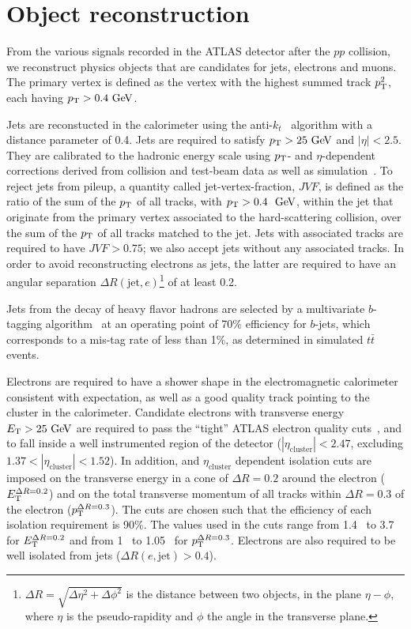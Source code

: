 \section{Object reconstruction}\label{sect:objects}
From the various signals recorded in the ATLAS detector after the $pp$ collision, we reconstruct
physics objects that are candidates for jets, electrons and muons. The primary vertex is defined
as the vertex with the highest summed track $p_{\mathrm{T}}^2$, each having $\pT>0.4 \GeV{}$.

Jets are reconstucted in the calorimeter using the anti-$k_t$~\cite{Cacciari:2008gp} algorithm with
a distance parameter of 0.4. Jets are required to satisfy $\pt>25 \GeV$ and $|\eta|<2.5$. They are
calibrated to the hadronic energy scale using $p_{\mathrm{T}}$- and $\eta$-dependent corrections derived from
collision and test-beam data as well as simulation~\cite{Aad:2011he}. To reject jets from pileup, 
a quantity called jet-vertex-fraction, $JVF$, is defined as the ratio of the sum
of the $p_{\mathrm{T}}$ of all tracks, with $\pt>0.4~\GeV{}$, within the jet that originate from the primary 
vertex associated to the hard-scattering collision, over the sum of the $p_{\mathrm{T}}$ of all tracks 
matched to the jet. Jets with associated tracks are required to have $JVF>0.75$; we also
accept jets without any associated tracks. In order to avoid reconstructing electrons as jets,
the latter are required to have an angular separation 
$\Delta R(\mathrm{jet},e)$\footnote{$\Delta R=\sqrt{\Delta\eta^2+\Delta\phi^2}$ is the distance 
between two objects, in
the plane $\eta-\phi$, where $\eta$ is the pseudo-rapidity and $\phi$ the angle in the transverse
plane.} of at least 0.2.

Jets from the decay of heavy flavor hadrons are selected by a multivariate $b$-tagging 
algorithm~\cite{ATLAS-CONF-2012-043} at an operating point of 70\% efficiency for $b$-jets, which
corresponds to a
mis-tag rate of less than 1\%, as determined in simulated $t\bar{t}$ events.

Electrons are required to have a shower shape in the electromagnetic calorimeter consistent with
expectation, as well as a good quality track pointing to the cluster in the calorimeter.
Candidate electrons with transverse energy $\ET>25 \GeV$ are required to pass the ``tight''
ATLAS electron quality cuts~\cite{Aad:2011mk}, and to fall inside a well instrumented region
of the detector ($|\eta_\mathrm{cluster}|<2.47$, excluding $1.37<|\eta_\mathrm{cluster}|<1.52$). 
In addition, \ET{} and $\eta_\mathrm{cluster}$ dependent isolation cuts are imposed on the transverse 
energy in a cone of $\Delta R = 0.2$ around the electron ($E_{\mathrm{T}}^{\Delta R=0.2}$) and on the total 
transverse momentum of all tracks within $\Delta R = 0.3$ of the electron ($p_{\mathrm{T}}^{\Delta R=0.3}$).
The cuts are chosen such that the efficiency of each isolation requirement is 90\%. The values used
in the cuts range from 1.4~\GeV{} to 3.7~\GeV{} for $E_{\mathrm{T}}^{\Delta R=0.2}$ and from 1~\GeV{} to 1.05~\GeV{}
for $p_{\mathrm{T}}^{\Delta R=0.3}$. Electrons are also required to be well 
isolated from jets ($\Delta R(e,\mathrm{jet})>0.4$).

